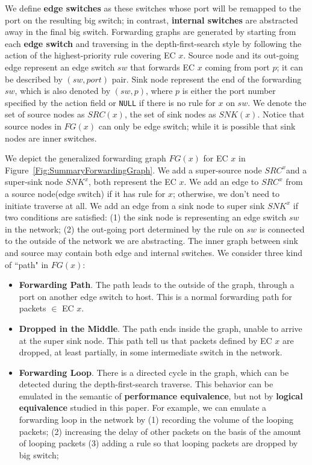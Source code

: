 We define \textbf{edge switches} as these switches whose port will be remapped to the port on
the resulting big switch;
in contrast, \textbf{internal switches} are abstracted away in the final big switch.
Forwarding graphs are generated by starting from each \textbf{edge switch} and traversing
in the depth-first-search style by following the action of the highest-priority rule
covering EC $x$.
Source node and its out-going edge represent an edge switch $sw$ that
forwards EC $x$ coming from port $p$; it can be described by $(sw, port)$ pair.
Sink node represent the end of the forwarding $sw$,
which is also denoted by $(sw, p)$, where $p$ is either the port number
specified by the action field or \texttt{NULL} if there is no rule for $x$ on $sw$.
We denote the set of source nodes as $SRC(x)$, the set of sink nodes as $SNK(x)$.
Notice that source nodes in $FG(x)$ can only be edge switch;
while it is possible that sink nodes are inner switches.

We depict the generalized forwarding graph $FG(x)$ for EC $x$
in Figure~\ref{Fig:SummaryForwardingGraph}.
We add a super-source node $SRC^x$and a super-sink node $SNK^x$, both represent the EC $x$.
We add an edge to $SRC^x$ from a source node(edge switch) if it has rule for $x$;
otherwise, we don't need to initiate traverse at all.
We add an edge from a sink node to super sink $SNK^x$ if two conditions are satisfied:
(1) the sink node is representing an edge switch $sw$ in the network;
(2) the out-going port determined by the rule on $sw$ is connected to the outside of the
network we are abstracting.
The inner graph between sink and source may contain both edge and internal switches.
We consider three kind of ``path" in $FG(x)$:
\begin{itemize}
\item \textbf{Forwarding Path}. The path leads to the outside of the graph, through
        a port on another edge switch to host.
        This is a normal forwarding path for packets $\in$ EC $x$.
\item \textbf{Dropped in the Middle}. The path ends inside the graph, unable to arrive
        at the super sink node. This path tell us that packets
        defined by EC $x$ are dropped, at least partially,
        in some intermediate switch in the network.
\item \textbf{Forwarding Loop}. There is a directed cycle in the graph, which can be
        detected during the depth-first-search traverse.
        This behavior can be emulated in the semantic of \textbf{performance equivalence},
        but not by \textbf{logical equivalence} studied in this paper.        
        For example, we can emulate a forwarding loop in the network by
        (1) recording the volume of the looping packets;
        (2) increasing the delay of other packets on the basis of the amount of looping packets
        (3) adding a rule so that looping packets are dropped by big switch;
\end{itemize}

